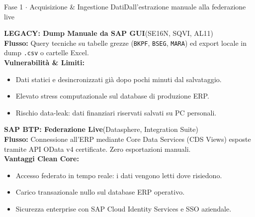 \documentclass[a4paper,10pt]{extarticle}
\begin{document}
\begin{wfphasebox}{Fase 1 $\cdot$ Acquisizione \& Ingestione Dati}{Dall'estrazione manuale alla federazione live}
  \begin{tcbraster}[raster columns=2, raster equal height, raster column skip=5pt]
    \begin{tcolorbox}[cardbase, colback=legacybg, colframe=legacyred, leftrule=2.5pt]
      \fontsize{7.3}{8.9}\selectfont
      \textbf{\color{legacydarkred}LEGACY: Dump Manuale da SAP GUI}\hfill\color{textmuted}(SE16N, SQVI, AL11)\\
      \textbf{Flusso:} Query tecniche su tabelle grezze (\texttt{BKPF}, \texttt{BSEG}, \texttt{MARA}) ed export locale in dump \texttt{.csv} o cartelle Excel.\\
      \textbf{\color{legacydarkred}Vulnerabilit\`a \& Limiti:}
      \begin{itemize}[leftmargin=8pt, itemsep=0pt, topsep=1pt]
        \item Dati statici e desincronizzati gi\`a dopo pochi minuti dal salvataggio.
        \item Elevato stress computazionale sul database di produzione ERP.
        \item Rischio data-leak: dati finanziari riservati salvati su PC personali.
      \end{itemize}
    \end{tcolorbox}
    \begin{tcolorbox}[cardbase, colback=modernbg, colframe=modernteal, leftrule=2.5pt]
      \fontsize{7.3}{8.9}\selectfont
      \textbf{\color{moderndarkteal}SAP BTP: Federazione Live}\hfill\color{textmuted}(Datasphere, Integration Suite)\\
      \textbf{Flusso:} Connessione all'ERP mediante Core Data Services (CDS Views) esposte tramite API OData v4 certificate. Zero esportazioni manuali.\\
      \textbf{\color{moderndarkteal}Vantaggi Clean Core:}
      \begin{itemize}[leftmargin=8pt, itemsep=0pt, topsep=1pt]
        \item Accesso federato in tempo reale: i dati vengono letti dove risiedono.
        \item Carico transazionale nullo sul database ERP operativo.
        \item Sicurezza enterprise con SAP Cloud Identity Services e SSO aziendale.
      \end{itemize}
    \end{tcolorbox}
  \end{tcbraster}
\end{wfphasebox}
\end{document}
